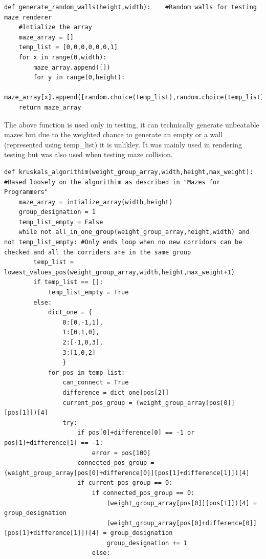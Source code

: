 \documentclass{article}
\begin{document}
\begin{lstlisting}
def generate_random_walls(height,width):    #Random walls for testing maze renderer
    #Intialize the array
    maze_array = []
    temp_list = [0,0,0,0,0,0,1]
    for x in range(0,width):
        maze_array.append([])
        for y in range(0,height):
            maze_array[x].append([random.choice(temp_list),random.choice(temp_list),random.choice(temp_list),random.choice(temp_list)])
    return maze_array
\end{lstlisting}
The above function is used only in testing, it can technically generate unbeatable mazes but due to the weighted chance to generate an empty or 
a wall (represented using temp\_list) it is unlikley. It  was mainly used in rendering testing but was also used when testing maze collision. 
\clearpage
\begin{lstlisting}
def kruskals_algorithim(weight_group_array,width,height,max_weight): #Based loosely on the algorithim as described in "Mazes for Programmers"
    maze_array = intialize_array(width,height)
    group_designation = 1                                                                                                                                           
    temp_list_empty = False
    while not all_in_one_group(weight_group_array,height,width) and not temp_list_empty: #Only ends loop when no new corridors can be checked and all the corriders are in the same group
        temp_list = lowest_values_pos(weight_group_array,width,height,max_weight+1)
        if temp_list == []:
            temp_list_empty = True
        else:
            dict_one = {
                0:[0,-1,1],
                1:[0,1,0],
                2:[-1,0,3],
                3:[1,0,2]
                }
            for pos in temp_list:
                can_connect = True
                difference = dict_one[pos[2]]
                current_pos_group = (weight_group_array[pos[0]][pos[1]])[4]                
                try:
                    if pos[0]+difference[0] == -1 or pos[1]+difference[1] == -1:
                        error = pos[100]
                    connected_pos_group = (weight_group_array[pos[0]+difference[0]][pos[1]+difference[1]])[4]
                    if current_pos_group == 0:
                        if connected_pos_group == 0:
                            (weight_group_array[pos[0]][pos[1]])[4] = group_designation
                            (weight_group_array[pos[0]+difference[0]][pos[1]+difference[1]])[4] = group_designation
                            group_designation += 1
                        else:

\end{lstlisting}
\end{document}
